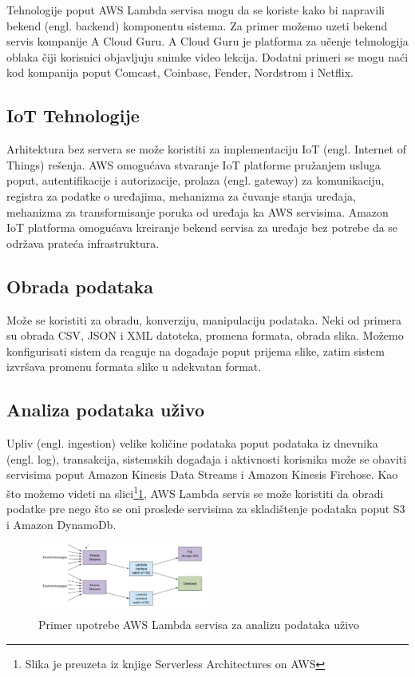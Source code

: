 \documentclass[12pt,oneside]{memoir}
\begin{document}
Tehnologije poput AWS Lambda servisa mogu da se koriste kako bi napravili bekend (engl. backend) komponentu sistema. Za primer možemo uzeti bekend servis kompanije A Cloud Guru. A Cloud Guru je platforma za učenje tehnologija oblaka čiji korisnici objavljuju snimke video lekcija. Dodatni primeri se mogu naći kod kompanija poput Comcast, Coinbase, Fender, Nordstrom i Netflix\cite{ascs}.

\subsection{IoT Tehnologije}

Arhitektura bez servera se može koristiti za implementaciju IoT (engl. Internet of Things) rešenja. AWS omogućava stvaranje IoT platforme pružanjem usluga poput, autentifikacije i autorizacije, prolaza (engl. gateway) za komunikaciju, registra za podatke o uređajima, mehanizma za čuvanje stanja uređaja, mehanizma za transformisanje poruka od uređaja ka AWS servisima\cite{aicf}. Amazon IoT platforma omogućava kreiranje bekend servisa za uređaje bez potrebe da se održava prateća infrastruktura.

\subsection{Obrada podataka}
Može se koristiti za obradu, konverziju, manipulaciju podataka. Neki od primera su obrada CSV, JSON i XML datoteka, promena formata, obrada slika. Možemo konfigurisati sistem da reaguje na događaje poput prijema slike, zatim sistem izvršava promenu formata slike u adekvatan format.

\subsection{Analiza podataka uživo}
Upliv (engl. ingestion) velike količine podataka poput podataka iz dnevnika (engl. log), transakcija, sistemskih događaja i aktivnosti korisnika može se obaviti servisima poput Amazon Kinesis Data Streams i Amazon Kinesis Firehose. Kao što možemo videti na slici\footnote{Slika je preuzeta iz knjige Serverless Architectures on AWS}\ref{fig:AnalizaPodataka}, AWS Lambda servis se može koristiti da obradi podatke pre nego što se oni proslede servisima za skladištenje podataka poput S3 i Amazon DynamoDb.

\begin{figure}[!ht]
  \centering
  \includegraphics[width=0.5\textwidth]{Slika 8.png}
  \caption{Primer upotrebe AWS Lambda servisa za analizu podataka uživo}
  \label{fig:AnalizaPodataka}
\end{figure}
\end{document}
